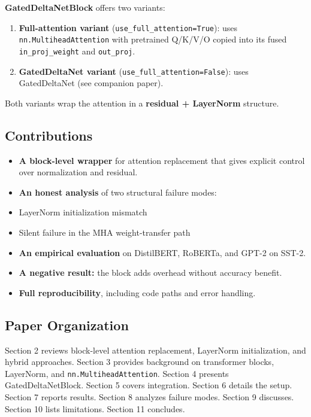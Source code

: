 \textbf{GatedDeltaNetBlock} offers two variants:

\begin{enumerate}
\item \textbf{Full-attention variant} (\texttt{use\_full\_attention=True}): uses
  \texttt{nn.MultiheadAttention} with pretrained Q/K/V/O copied into its fused
  \texttt{in\_proj\_weight} and \texttt{out\_proj}.

\item \textbf{GatedDeltaNet variant} (\texttt{use\_full\_attention=False}): uses GatedDeltaNet
  (see companion paper).

\end{enumerate}
Both variants wrap the attention in a \textbf{residual + LayerNorm} structure.

\subsection{Contributions}

\begin{itemize}
\item \textbf{A block-level wrapper} for attention replacement that gives explicit
  control over normalization and residual.
\item \textbf{An honest analysis} of two structural failure modes:
\item LayerNorm initialization mismatch
\item Silent failure in the MHA weight-transfer path
\item \textbf{An empirical evaluation} on DistilBERT, RoBERTa, and GPT-2 on SST-2.
\item \textbf{A negative result:} the block adds overhead without accuracy benefit.
\item \textbf{Full reproducibility}, including code paths and error handling.

\end{itemize}
\subsection{Paper Organization}

Section 2 reviews block-level attention replacement, LayerNorm 
initialization, and hybrid approaches. Section 3 provides background on 
transformer blocks, LayerNorm, and \texttt{nn.MultiheadAttention}. Section 4 
presents GatedDeltaNetBlock. Section 5 covers integration. Section 6 
details the setup. Section 7 reports results. Section 8 analyzes failure 
modes. Section 9 discusses. Section 10 lists limitations. Section 11 
concludes.




